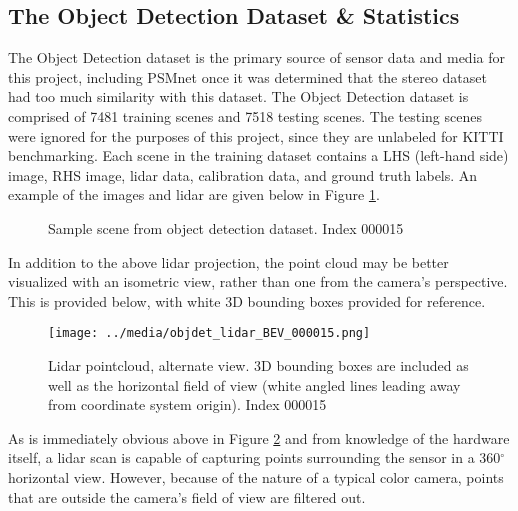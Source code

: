 \subsection{The Object Detection Dataset \& Statistics}
The Object Detection dataset is the primary source of sensor data and media for this project, including PSMnet once it was determined that the stereo dataset had too much similarity with this dataset. The Object Detection dataset is comprised of 7481 training scenes and 7518 testing scenes. The testing scenes were ignored for the purposes of this project, since they are unlabeled for KITTI benchmarking. Each scene in the training dataset contains a LHS (left-hand side) image, RHS image, lidar data, calibration data, and ground truth labels. An example of the images and lidar are given below in Figure \ref{objdet_sample}.

\begin{figure}[ht]
    \centering
    \caption{Sample scene from object detection dataset. Index 000015}
    \label{objdet_sample}
\end{figure}

In addition to the above lidar projection, the point cloud may be better visualized with an isometric view, rather than one from the camera's perspective. This is provided below, with white 3D bounding boxes provided for reference.

\begin{figure}[ht]
    \texttt{[image: ../media/objdet\_lidar\_BEV\_000015.png]}
    \caption{Lidar pointcloud, alternate view. 3D bounding boxes are included as well as the horizontal field of view (white angled lines leading away from coordinate system origin). Index 000015}
    \label{objdet_lidar_sample}
\end{figure}

\def \DEG{$^{\circ}$} %

As is immediately obvious above in Figure \ref{objdet_lidar_sample} and from knowledge of the hardware itself, a lidar scan is capable of capturing points surrounding the sensor in a 360\DEG horizontal view. However, because of the nature of a typical color camera, points that are outside the camera's field of view are filtered out.

